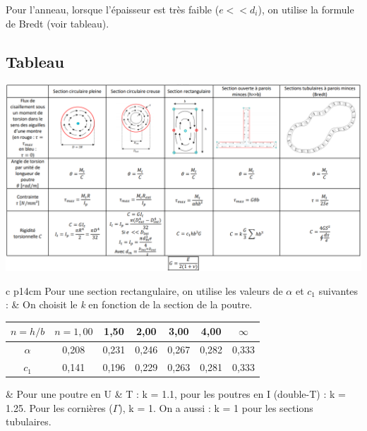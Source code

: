 \documentclass[a4paper]{article}
\begin{document}
Pour l'anneau, lorsque l'épaisseur est très faible ($ e << d_i $), on utilise la formule de Bredt (voir tableau).





\begin{landscape}

\subsection{Tableau}

\begin{center}
\includegraphics[width=1.55\textwidth]{images/Torsion03.PNG}
\end{center}
\begin{tabular}{c p{14cm}}
Pour une section rectangulaire, on utilise les valeurs de $ \alpha $ et $ c_1 $ suivantes : & On choisit le \emph{k} en fonction de la section de la poutre. \\
\begin{tabular}{|c|cccccc|} \hline
$ n = h / b $ & $ n = 1,00 $ & 1,50 & 2,00 & 3,00 & 4,00 & $ \infty $ \\ \hline
$ \alpha $ & 0,208 & 0,231 & 0,246 & 0,267 & 0,282 & 0,333 \\ \hline
$ c_1 $ & 0,141 & 0,196 & 0,229 & 0,263 & 0,281 & 0,333 \\ \hline
\end{tabular} & 
Pour une poutre en U \& T : k = 1.1, pour les poutres en I (double-T) : k = 1.25. Pour les cornières ($ \Gamma $), k = 1. On a aussi : k = 1 pour les sections tubulaires.
\end{tabular}
\end{landscape}
\end{document}
